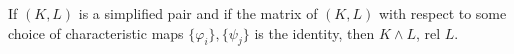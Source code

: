 If $(K, L)$ is a simplified pair and if the matrix of $(K, L)$ with respect to some choice of characteristic maps $\{\varphi_i\}, \{\psi_j\}$ is the identity, then $K \wedge L$, rel $L$.
